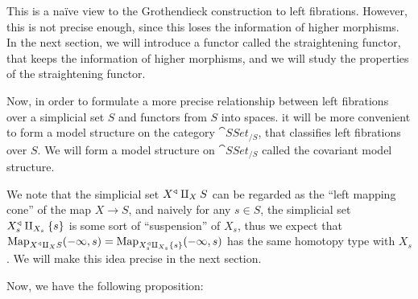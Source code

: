 
This is a na\"ive view to the Grothendieck construction to left fibrations. However, this is not precise enough, since
this loses the information of higher morphisms. In the next section, we will introduce a functor called the straightening functor,
that keeps the information of higher morphisms, and we will study the properties of the straightening functor.

Now, in order to formulate a more precise relationship between left fibrations over a simplicial set $S$ and functors
from $S$ into spaces. it will be more convenient to form a model structure on the category $\cat{SSet}_{/S}$,
that classifies left fibrations over $S$. We will form a model structure on $\cat{SSet}_{/S}$ called the covariant model structure.


We note that the simplicial set $X^\triangleleft\amalg_{X}S$ can be regarded as the ``left mapping cone'' of the map $X\to S$, and naively
for any $s\in S$, the simplicial set $X_s^\triangleleft\amalg_{X_s}\{s\}$ is some sort of ``suspension'' of $X_s$,
thus we expect that $\operatorname{Map}_{X^\triangleleft\amalg_{X}S}(-\infty,s)=\operatorname{Map}_{X_s^\triangleleft\amalg_{X_s}\{s\}}(-\infty,s)$
has the same homotopy type with $X_s$. We will make this idea precise in the next section.

Now, we have the following proposition:


